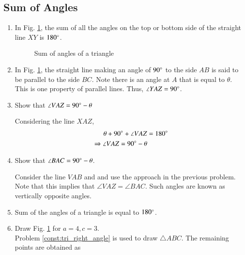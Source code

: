 \subsection{Sum of Angles}
\renewcommand{\theequation}{\theenumi}
\begin{enumerate}[label=\arabic*.,ref=\thesubsection.\theenumi]
\item 	In Fig. \ref{fig:tri_sum_angle}, the sum of all the angles on the top or bottom side of the straight line $XY$ is $180\degree$.


\begin{figure}[!ht]
	\begin{center}
		\resizebox{\columnwidth}{!}{}
	\end{center}
	\caption{Sum of angles of a triangle}
	\label{fig:tri_sum_angle}	
\end{figure}



\item
In Fig. \ref{fig:tri_sum_angle}, the straight line making an angle of $90\degree$ to the side $AB$ is said to be parallel to the side $BC$. Note there is an angle at $A$ that is equal to $\theta$.  This is one property of parallel lines.  Thus, $\angle YAZ = 90\degree$.


\item
	Show that $\angle VAZ = 90\degree - \theta$
		
	\solution Considering the line $XAZ$,
	\begin{align}
	\theta + 90\degree + \angle VAZ &= 180\degree \\
	\Rightarrow  \angle VAZ =  90\degree - \theta
	\end{align}

\item
	\label{prob:tri_compl_angle}
	Show that $\angle BAC = 90\degree - \theta$.
	
	\solution Consider the line $VAB$ and and use the approach in the previous problem.  Note that this implies that $\angle VAZ = \angle BAC$.  Such angles are known as vertically opposite angles. 
	 
\item
Sum of the angles of a triangle is equal to $180\degree$.
%
\item Draw Fig. \ref{fig:tri_sum_angle} for $a = 4, c =3$.
%
\\
\solution Problem \ref{const:tri_right_angle} is used to draw $\triangle ABC$.  The remaining points are obtained as


\end{enumerate}
